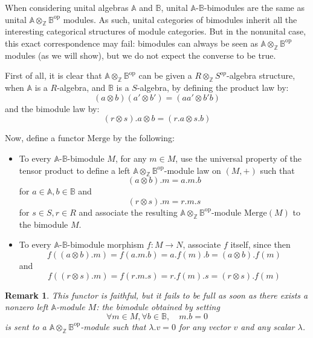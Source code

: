 \documentclass[a4paper,fleqn]{cas-sc}
\newtheorem{rem}{Remark}%
\newcommand{\bA}{\mathbb{A}}
\newcommand{\bB}{\mathbb{B}}
\newcommand{\merg}{\mathrm{Merge}}
\begin{document}
\label{sec:convenient}

When considering unital algebras $\bA$ and $\bB$, unital $\bA$-$\bB$-bimodules are the same as unital $\bA \otimes_{\mathbb{Z}} \bB^{\text{op}}$ modules. As such, unital categories of bimodules inherit all the interesting categorical structures of module categories. But in the nonunital case, this exact correspondence may fail: bimodules can always be seen as $\bA \otimes_{\mathbb{Z}} \bB^{\text{op}}$ modules (as we will show), but we do not expect the converse to be true. %



First of all, it is clear that $\bA \otimes_{\mathbb{Z}} \bB^{\text{op}}$ can be given a $R \otimes_{\mathbb{Z}} S^{op}$-algebra structure, when $\bA$ is a $R$-algebra, and $\bB$ is a $S$-algebra, by defining the product law by:
\[
(a \otimes b)(a' \otimes b') = (aa'\otimes b'b)
\]
and the bimodule law by:
\[
(r \otimes s).a \otimes b = (r.a \otimes s.b)
\]


Now, define a functor $\merg$ by the following:
\begin{itemize}
    \item[-] To every 
    $\bA$-$\bB$-bimodule $M$, for any $m \in M$, use the universal property of the tensor product to define a left $\bA \otimes_{\mathbb{Z}} \bB^{\text{op}}$-module law on $(M,+)$ such that 
    \[
    (a \otimes b).m = a.m.b 
    \]
    for $a \in \bA, b\in \bB$
    and 
    \[
    (r \otimes s).m = r.m.s
    \]
    for $s \in S, r\in R$
    and associate the resulting $\bA \otimes_{\mathbb{Z}} \bB^{\text{op}}$-module $\merg(M)$ to the bimodule $M$.
    \item[-] To every $\bA$-$\bB$-bimodule morphism $f: M \to N$, associate $f$ itself, since then 
    \[
    f((a \otimes b).m) = f(a.m.b) = a.f(m).b = (a \otimes b).f(m)
    \]
    and
    \[
    f((r \otimes s).m) = f(r.m.s) = r.f(m).s = (r \otimes s).f(m)
    \]
\end{itemize}
\begin{rem}
This functor is faithful, but it fails to be full as soon as there exists a nonzero left $\bA$-module $M$: the bimodule obtained by setting
\[\forall m \in M, \forall b \in \bB, \quad m.b = 0\]
is sent to a $\bA \otimes_{\mathbb{Z}} \bB^{\text{op}}$-module such that $\lambda.v = 0$ for any vector $v$ and any scalar $\lambda$.
\end{rem}
\end{document}
